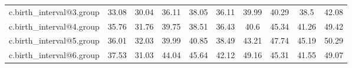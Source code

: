 \begin{table}[htbp]
\begin{tabular}{l*{9}{c}}
c.birth\_interval@3.group&       33.08&       30.04&       36.11&       38.05&       36.11&       39.99&       40.29&        38.5&       42.08\\
c.birth\_interval@4.group&       35.76&       31.76&       39.75&       38.51&       36.43&        40.6&       45.34&       41.26&       49.42\\
c.birth\_interval@5.group&       36.01&       32.03&       39.99&       40.85&       38.49&       43.21&       47.74&       45.19&       50.29\\
c.birth\_interval@6.group&       37.53&       31.03&       44.04&       45.64&       42.12&       49.16&       45.31&       41.55&       49.07\\
\hline\hline
\end{tabular}
\end{table}
